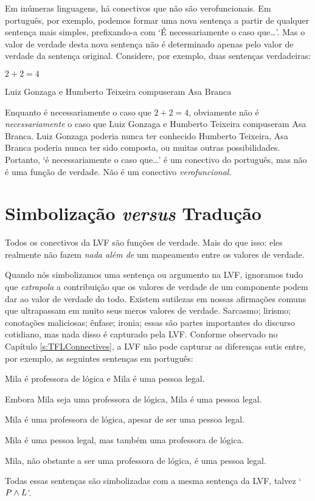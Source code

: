 Em inúmeras linguagens, há conectivos que não são verofuncionais.
Em português, por exemplo, podemos formar uma nova sentença a partir de qualquer sentença mais simples, prefixando-a com `É necessariamente o caso que\ldots'.
Mas o valor de verdade desta nova sentença não é determinado apenas pelo valor de verdade da sentença original.
Considere, por exemplo, duas sentenças verdadeiras:
	\begin{earg}
		\item $2 + 2 = 4$
		\item Luiz Gonzaga e Humberto Teixeira compuseram Asa Branca
	\end{earg}
Enquanto é necessariamente o caso que $2+2=4$, obviamente não é \emph{necessariamente} o caso que Luiz Gonzaga e Humberto Teixeira compuseram Asa Branca.
Luiz Gonzaga poderia nunca ter conhecido Humberto Teixeira, Asa Branca poderia nunca ter sido composta, ou muitas outras possibilidades.
Portanto, `é necessariamente o caso que\ldots' é um conectivo do português, mas não é uma função de verdade.
Não é um conectivo \emph{verofuncional}.



\section{Simbolização \emph{versus} Tradução}
Todos os conectivos da LVF são funções de verdade.
Mais do que isso:  eles realmente não fazem \emph{nada além de} um mapeamento entre os valores de verdade.  

Quando nós simbolizamos uma sentença ou argumento na LVF, ignoramos tudo que \emph{extrapola} a contribuição que os valores de verdade de um componente podem dar ao valor de verdade do todo.
Existem sutilezas em nossas afirmações comuns que ultrapassam em muito seus meros valores de verdade.
Sarcasmo; lirismo; conotações maliciosas; ênfase; ironia; essas são partes importantes do discurso cotidiano, mas nada disso é capturado pela LVF.
Conforme observado no Capítulo \ref{s:TFLConnectives},
a LVF não pode capturar as diferenças sutis entre, por exemplo, as seguintes sentenças em português:
	\begin{earg}
		\item Mila é professora de lógica e Mila é uma pessoa legal.
		\item Embora Mila seja uma professora de lógica, Mila é uma pessoa legal.
		\item Mila é uma professora de lógica, apesar de ser uma pessoa legal.
		\item Mila é uma pessoa legal, mas também uma professora de lógica.
		\item Mila, não obstante a ser uma professora de lógica, é uma pessoa legal.
	\end{earg}
Todas essas sentenças são simbolizadas com a mesma sentença da LVF, talvez `$P \wedge L$'.

